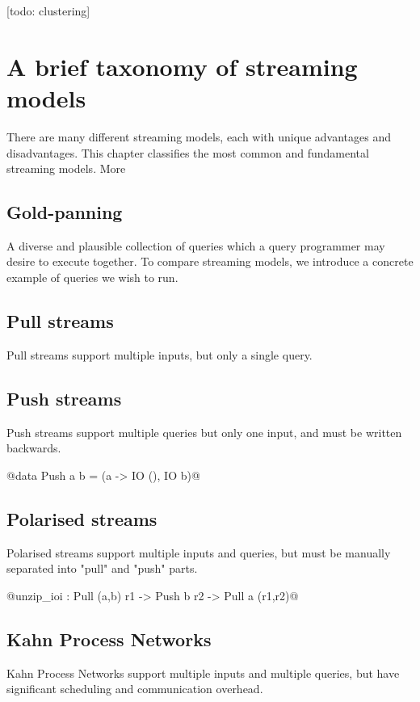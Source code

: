 [todo: clustering]

\section{A brief taxonomy of streaming models}
There are many different streaming models, each with unique advantages and disadvantages.
This chapter classifies the most common and fundamental streaming models.
More

\subsection{Gold-panning}
A diverse and plausible collection of queries which a query programmer may desire to execute together.
To compare streaming models, we introduce a concrete example of queries we wish to run.

\subsection{Pull streams}
Pull streams support multiple inputs, but only a single query.

\subsection{Push streams}
Push streams support multiple queries but only one input, and must be written backwards.

@data Push a b = (a -> IO (), IO b)@

\subsection{Polarised streams}
Polarised streams support multiple inputs and queries, but must be manually separated into "pull" and "push" parts.

@unzip_ioi : Pull (a,b) r1 -> Push b r2 -> Pull a (r1,r2)@

\subsection{Kahn Process Networks}
Kahn Process Networks support multiple inputs and multiple queries, but have significant scheduling and communication overhead.

